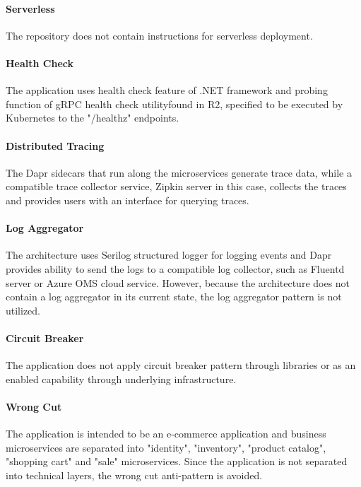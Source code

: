 \documentclass{Configuration_Files/PoliMi3i_thesis}
\begin{document}
\paragraph{Serverless} The repository does not contain instructions for serverless deployment.

\paragraph{Health Check} The application uses health check feature of .NET framework and probing function of gRPC health check utility\footnotemark[73] found in R2, specified to be executed by Kubernetes to the "/healthz" endpoints.

\paragraph{Distributed Tracing} The Dapr sidecars that run along the microservices generate trace data, while a compatible trace collector service, Zipkin server in this case, collects the traces and provides users with an interface for querying traces.

\paragraph{Log Aggregator} The architecture uses Serilog structured logger for logging events and Dapr provides ability to send the logs to a compatible log collector, such as Fluentd server or Azure OMS cloud service.
However, because the architecture does not contain a log aggregator in its current state, the log aggregator pattern is not utilized.

\paragraph{Circuit Breaker} The application does not apply circuit breaker pattern through libraries or as an enabled capability through underlying infrastructure.

\paragraph{Wrong Cut} The application is intended to be an e-commerce application and business microservices are separated into "identity", "inventory", "product catalog", "shopping cart" and "sale" microservices.
Since the application is not separated into technical layers, the wrong cut anti-pattern is avoided.
\end{document}
